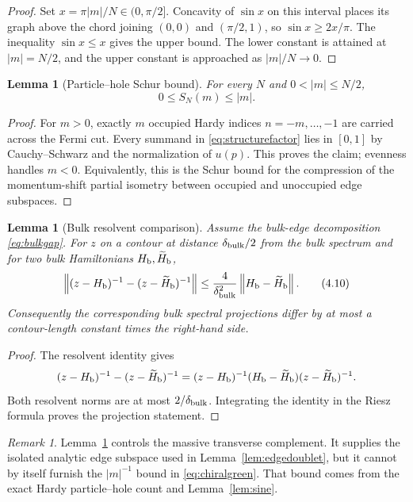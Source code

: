 \documentclass[11pt]{article}
\newtheorem{lemma}[theorem]{Lemma}
\theoremstyle{remark}
\newtheorem{remark}[theorem]{Remark}
\newcommand{\norm}[1]{\left\lVert#1\right\rVert}
\begin{document}
\begin{proof}
Set $x=\pi|m|/N\in(0,\pi/2]$.  Concavity of $\sin x$ on this interval
places its graph above the chord joining $(0,0)$ and $(\pi/2,1)$, so
$\sin x\ge2x/\pi$.  The inequality $\sin x\le x$ gives the upper bound.
The lower constant is attained at $|m|=N/2$, and the upper constant is
approached as $|m|/N\to0$.
\end{proof}

\begin{lemma}[Particle--hole Schur bound]\label{lem:Schur}
For every $N$ and $0<|m|\le N/2$,
\[
 0\le S_N(m)\le |m|.
\tag{4.9}\label{eq:Schur}
\]
\end{lemma}

\begin{proof}
For $m>0$, exactly $m$ occupied Hardy indices
$n=-m,\ldots,-1$ are carried across the Fermi cut.  Every summand in
\eqref{eq:structurefactor} lies in $[0,1]$ by Cauchy--Schwarz and the
normalization of $u(p)$.  This proves the claim; evenness handles
$m<0$.  Equivalently, this is the Schur bound for the compression of the
momentum-shift partial isometry between occupied and unoccupied edge
subspaces.
\end{proof}

\begin{lemma}[Bulk resolvent comparison]\label{lem:resolvent}
Assume the bulk-edge decomposition \eqref{eq:bulkgap}.  For
$z$ on a contour at distance $\delta_{\rm bulk}/2$ from the bulk
spectrum and for two bulk Hamiltonians $H_{\rm b},\widetilde H_{\rm b}$,
\[
 \norm{(z-H_{\rm b})^{-1}-(z-\widetilde H_{\rm b})^{-1}}
 \le\frac{4}{\delta_{\rm bulk}^2}
       \norm{H_{\rm b}-\widetilde H_{\rm b}}.
\tag{4.10}\label{eq:resolventidentity}
\]
Consequently the corresponding bulk spectral projections differ by at
most a contour-length constant times the right-hand side.
\end{lemma}

\begin{proof}
The resolvent identity gives
\[
 (z-H_{\rm b})^{-1}-(z-\widetilde H_{\rm b})^{-1}
 =(z-H_{\rm b})^{-1}(H_{\rm b}-\widetilde H_{\rm b})
   (z-\widetilde H_{\rm b})^{-1}.
\]
Both resolvent norms are at most $2/\delta_{\rm bulk}$.  Integrating the
identity in the Riesz formula proves the projection statement.
\end{proof}

\begin{remark}
Lemma~\ref{lem:resolvent} controls the massive transverse complement.
It supplies the isolated analytic edge subspace used in
Lemma~\ref{lem:edgedoublet}, but it cannot by itself furnish the
$|m|^{-1}$ bound in \eqref{eq:chiralgreen}.  That bound comes from the
exact Hardy particle--hole count and Lemma~\ref{lem:sine}.
\end{remark}
\end{document}
